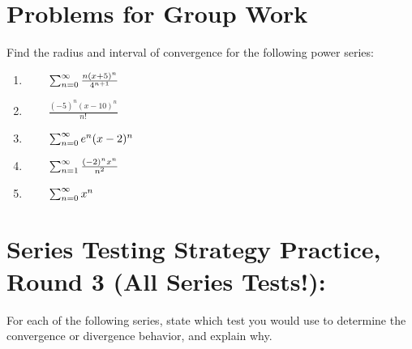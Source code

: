 \section*{Problems for Group Work}
Find the radius and interval of convergence for the following power series:
\begin{enumerate}
\item %

\(\qquad \sum_{n=0}^\infty \frac{n(x+5)^n}{4^{n+1}}\)
\vfill




\item \(\qquad \frac{(-5)^n (x-10)^n}{n!}\)

\vfill


\item \(\qquad\sum_{n=0}^\infty e^n(x-2)^n\)

\vfill


\pagebreak

\item \(\qquad\sum_{n=1}^\infty \frac{(-2)^n x^n}{n^2}\)

\vfill


\item \(\qquad\sum_{n=0}^\infty x^n\)

\vfill



\end{enumerate}


\section*{Series Testing Strategy Practice, Round 3 (All Series Tests!):}
For each of the following series, state which test you would use to determine the convergence or divergence behavior, and explain why.

